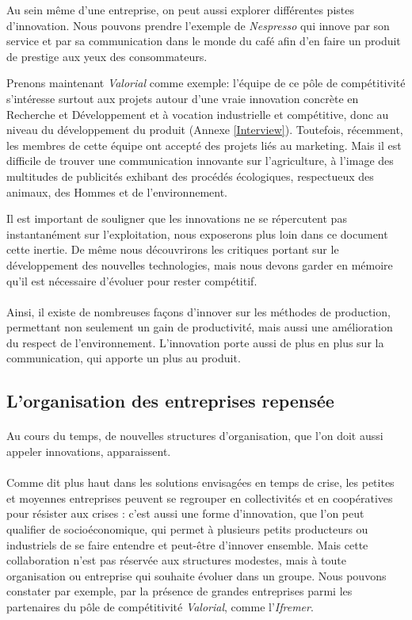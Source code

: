 \documentclass[a4paper,12pt]{report}
\begin{document}
			Au sein même d’une entreprise, on peut aussi explorer différentes pistes d'innovation. Nous pouvons prendre l’exemple de \textit{Nespresso} qui innove par son service et par sa communication dans le monde du café afin d’en faire un produit de prestige aux yeux des consommateurs.
			
			Prenons maintenant \textit{Valorial} comme exemple: l'équipe de ce pôle de compétitivité s'intéresse surtout aux projets autour d'une vraie innovation concrète en Recherche et Développement et à vocation industrielle et compétitive, donc au niveau du développement du produit (Annexe \ref{Interview}). Toutefois, récemment, les membres de cette équipe ont accepté des projets liés au marketing. Mais il est difficile de trouver une communication innovante sur l'agriculture, à l'image des multitudes de publicités exhibant des procédés écologiques, respectueux des animaux, des Hommes et de l'environnement. 
			
			Il est important de souligner que les innovations ne se répercutent pas instantanément sur l'exploitation, nous exposerons plus loin dans ce document cette inertie. De même nous découvrirons les critiques portant sur le développement des nouvelles technologies, mais nous devons garder en mémoire qu’il est nécessaire d’évoluer pour rester compétitif.
			
		\paragraph{}Ainsi, il existe de nombreuses façons d'innover sur les méthodes de production, permettant non seulement un gain de productivité, mais aussi une amélioration du respect de l'environnement. L'innovation porte aussi de plus en plus sur la communication, qui apporte un plus au produit.
			
			
		\subsection{L'organisation des entreprises repensée}
			\paragraph{}Au cours du temps, de nouvelles structures d’organisation, que l’on doit aussi appeler innovations, apparaissent.
			
			\paragraph{}Comme dit plus haut dans les solutions envisagées en temps de crise, les petites et moyennes entreprises peuvent se regrouper en collectivités et en coopératives pour résister aux crises : c’est aussi une forme d’innovation, que l’on peut qualifier de socioéconomique, qui permet à plusieurs petits producteurs ou industriels de se faire entendre et peut-être d’innover ensemble. 
			Mais cette collaboration n’est pas réservée aux structures modestes, mais à toute organisation ou entreprise qui souhaite évoluer dans un groupe. Nous pouvons constater par exemple, par la présence de grandes entreprises parmi les partenaires du pôle de compétitivité \textit{Valorial}, comme l’\textit{Ifremer}.
			
\end{document}
